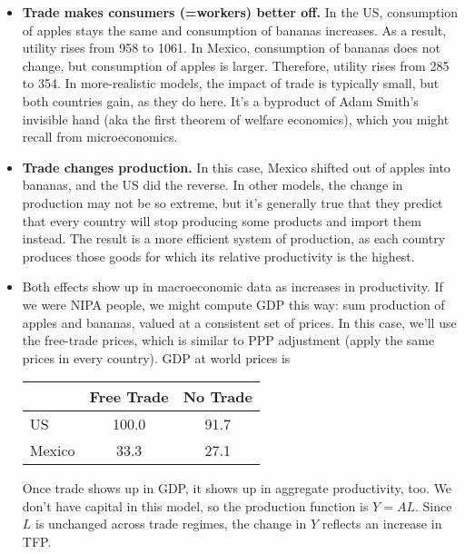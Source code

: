 \begin{itemize}

\item \textbf{Trade makes consumers (=workers) better off.}
In the US, consumption of apples stays the same and consumption of
bananas increases. As a result, utility rises from 958 to 1061. In
Mexico, consumption of bananas does not change, but consumption of
apples is larger. Therefore, utility rises from 285 to 354. In
more-realistic models, the impact of trade is typically small,
but both countries gain, as they do here.
It's a byproduct of Adam Smith's invisible hand (aka the first
theorem of welfare economics), which you might recall from microeconomics.

\item \textbf{Trade changes production.}  In this
case, Mexico shifted out of apples into bananas, and the US did the reverse.
In other models, the change in production may not be
so extreme, but it's generally true that they predict that every
country will stop producing some products and import them
instead.  The result is a more efficient system of production,
as each country produces those goods for which its relative
productivity is the highest.

\item Both effects show up in macroeconomic data as increases in
productivity.  If we were NIPA people, we might compute GDP this way:  sum production of apples and bananas, valued at a
consistent set of prices.  In this case, we'll use the free-trade
prices, which is similar to PPP adjustment (apply the
same prices in every country).  GDP at world prices is
%
%
\begin{center}
\begin{tabular}{lcc}
\toprule
                    &      Free Trade     &    No Trade    \\%

\midrule%
US                  &         100.0       &      91.7      \\%
%
Mexico              &          33.3       &      27.1      \\%
\bottomrule
\end{tabular}
\end{center}
%
%
Once trade shows up in GDP, it shows up in aggregate
productivity, too.  We don't have capital in this model, so the
production function is $Y = AL$.  Since $L$ is unchanged across
trade regimes, the change in $Y$ reflects an increase in TFP.


\end{itemize}
